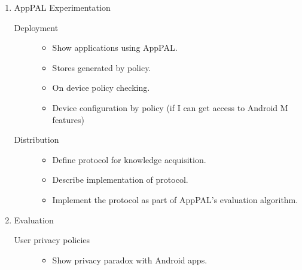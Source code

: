 \documentclass[a4paper]{scrartcl}
\begin{document}
\begin{enumerate}
  \item AppPAL Experimentation
    \begin{description}
      \item[Deployment]
        \hfill
        \begin{itemize}
          \item Show applications using AppPAL.
          \item Stores generated by policy.
          \item On device policy checking.
          \item Device configuration by policy (if I can get access to Android M features)
        \end{itemize}
      \item[Distribution]
        \hfill
        \begin{itemize}
          \item Define protocol for knowledge acquisition.
          \item Describe implementation of protocol.
          \item Implement the protocol as part of AppPAL's evaluation algorithm.
        \end{itemize}
    \end{description}
  \item Evaluation
    \begin{description}
      \item[User privacy policies]
        \hfill
        \begin{itemize}
          \item Show privacy paradox with Android apps.

\end{itemize}
\end{description}
\end{enumerate}
\end{document}
